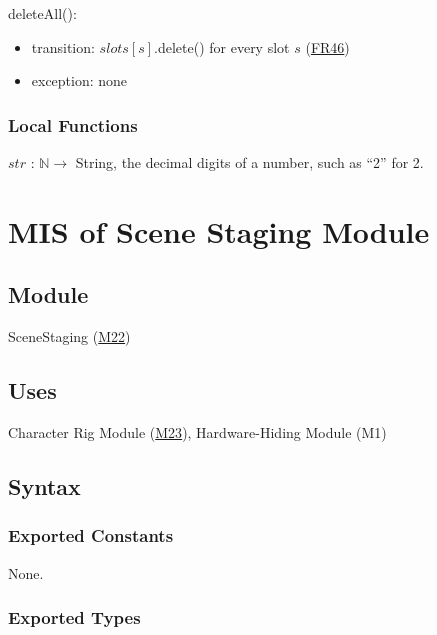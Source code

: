 \documentclass[10pt, titlepage]{article}
\newcommand{\srsurl}{https://team-hindsight.github.io/ophthamology-game/SRS/SRS.pdf}
\newcommand{\srsitemref}[2]{\href{\srsurl\#nameddest=#1}{#2}}
\newcommand{\misref}[2]{\hyperref[mis:#1]{M#2}}
\newcommand{\N}{\mathbb{N}}
\newcommand{\T}[1]{\mathit{#1}}          %
\begin{document}
\noindent deleteAll():
\begin{itemize}
\item transition: $\T{slots}[s]$.delete() for every slot $s$
  (\srsitemref{FR_ClearAllData}{FR46})
\item exception: none
\end{itemize}

\subsubsection{Local Functions}

\noindent $\T{str}$ : $\N \to$ String, the decimal digits of a number, such as
``2'' for 2.

\newpage
\section{MIS of Scene Staging Module} \label{mis:Staging}

\subsection{Module}

SceneStaging (\misref{Staging}{22})

\subsection{Uses}

Character Rig Module (\misref{Rig}{23}), Hardware-Hiding Module (M1)

\subsection{Syntax}

\subsubsection{Exported Constants}

None.

\subsubsection{Exported Types}
\end{document}

